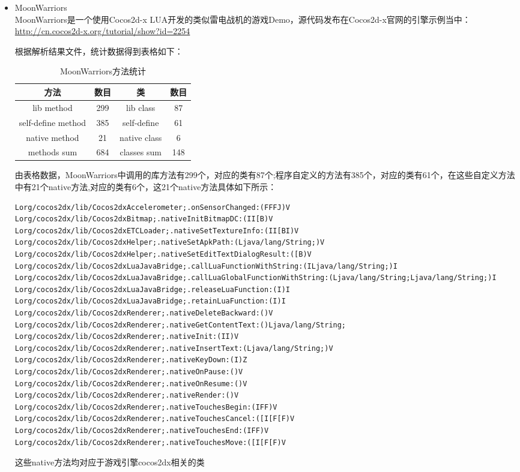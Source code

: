 \begin{itemize}
\item MoonWarriors\\
MoonWarriors是一个使用Cocos2d-x LUA开发的类似雷电战机的游戏Demo，源代码发布在Cocos2d-x官网的引擎示例当中：\url{http://cn.cocos2d-x.org/tutorial/show?id=2254}

根据解析结果文件，统计数据得到表格如下：
\begin{table}[htbp]
\centering
\caption{\label{MoonWarriors}MoonWarriors方法统计}
\begin{tabular}{|c|c|c|c|}
\hline
方法 & 数目 & 类 & 数目\\
\hline
lib method & 299 & lib class & 87\\
\hline
self-define method & 385 & self-define & 61\\
\hline
native method & 21 & native class & 6\\
\hline
methods sum & 684 & classes sum & 148\\
\hline
\end{tabular}
\end{table}

由表格数据，MoonWarriors中调用的库方法有299个，对应的类有87个;程序自定义的方法有385个，对应的类有61个，在这些自定义方法中有21个native方法,对应的类有6个，这21个native方法具体如下所示：
\begin{lstlisting}
Lorg/cocos2dx/lib/Cocos2dxAccelerometer;.onSensorChanged:(FFFJ)V
Lorg/cocos2dx/lib/Cocos2dxBitmap;.nativeInitBitmapDC:(II[B)V
Lorg/cocos2dx/lib/Cocos2dxETCLoader;.nativeSetTextureInfo:(II[BI)V
Lorg/cocos2dx/lib/Cocos2dxHelper;.nativeSetApkPath:(Ljava/lang/String;)V
Lorg/cocos2dx/lib/Cocos2dxHelper;.nativeSetEditTextDialogResult:([B)V
Lorg/cocos2dx/lib/Cocos2dxLuaJavaBridge;.callLuaFunctionWithString:(ILjava/lang/String;)I
Lorg/cocos2dx/lib/Cocos2dxLuaJavaBridge;.callLuaGlobalFunctionWithString:(Ljava/lang/String;Ljava/lang/String;)I
Lorg/cocos2dx/lib/Cocos2dxLuaJavaBridge;.releaseLuaFunction:(I)I
Lorg/cocos2dx/lib/Cocos2dxLuaJavaBridge;.retainLuaFunction:(I)I
Lorg/cocos2dx/lib/Cocos2dxRenderer;.nativeDeleteBackward:()V
Lorg/cocos2dx/lib/Cocos2dxRenderer;.nativeGetContentText:()Ljava/lang/String;
Lorg/cocos2dx/lib/Cocos2dxRenderer;.nativeInit:(II)V
Lorg/cocos2dx/lib/Cocos2dxRenderer;.nativeInsertText:(Ljava/lang/String;)V
Lorg/cocos2dx/lib/Cocos2dxRenderer;.nativeKeyDown:(I)Z
Lorg/cocos2dx/lib/Cocos2dxRenderer;.nativeOnPause:()V
Lorg/cocos2dx/lib/Cocos2dxRenderer;.nativeOnResume:()V
Lorg/cocos2dx/lib/Cocos2dxRenderer;.nativeRender:()V
Lorg/cocos2dx/lib/Cocos2dxRenderer;.nativeTouchesBegin:(IFF)V
Lorg/cocos2dx/lib/Cocos2dxRenderer;.nativeTouchesCancel:([I[F[F)V
Lorg/cocos2dx/lib/Cocos2dxRenderer;.nativeTouchesEnd:(IFF)V
Lorg/cocos2dx/lib/Cocos2dxRenderer;.nativeTouchesMove:([I[F[F)V
\end{lstlisting}
这些native方法均对应于游戏引擎cocos2dx相关的类 
 

\end{itemize}
